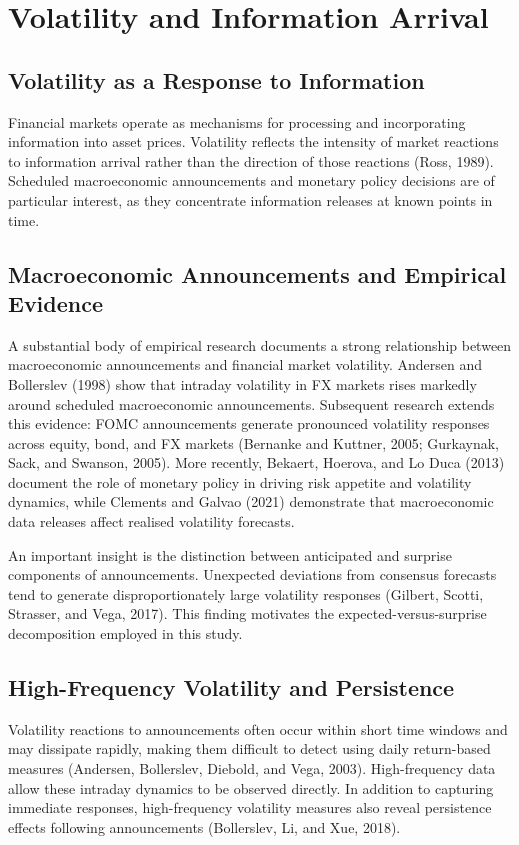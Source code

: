 \documentclass[12pt,a4paper]{report}
\begin{document}
\section{Volatility and Information Arrival}
\subsection{Volatility as a Response to Information}
Financial markets operate as mechanisms for processing and incorporating information into asset prices. Volatility reflects the intensity of market reactions to information arrival rather than the direction of those reactions (Ross, 1989). Scheduled macroeconomic announcements and monetary policy decisions are of particular interest, as they concentrate information releases at known points in time.

\subsection{Macroeconomic Announcements and Empirical Evidence}
A substantial body of empirical research documents a strong relationship between macroeconomic announcements and financial market volatility. Andersen and Bollerslev (1998) show that intraday volatility in FX markets rises markedly around scheduled macroeconomic announcements. Subsequent research extends this evidence: FOMC announcements generate pronounced volatility responses across equity, bond, and FX markets (Bernanke and Kuttner, 2005; Gurkaynak, Sack, and Swanson, 2005). More recently, Bekaert, Hoerova, and Lo Duca (2013) document the role of monetary policy in driving risk appetite and volatility dynamics, while Clements and Galvao (2021) demonstrate that macroeconomic data releases affect realised volatility forecasts.

An important insight is the distinction between anticipated and surprise components of announcements. Unexpected deviations from consensus forecasts tend to generate disproportionately large volatility responses (Gilbert, Scotti, Strasser, and Vega, 2017). This finding motivates the expected-versus-surprise decomposition employed in this study.

\subsection{High-Frequency Volatility and Persistence}
Volatility reactions to announcements often occur within short time windows and may dissipate rapidly, making them difficult to detect using daily return-based measures (Andersen, Bollerslev, Diebold, and Vega, 2003). High-frequency data allow these intraday dynamics to be observed directly. In addition to capturing immediate responses, high-frequency volatility measures also reveal persistence effects following announcements (Bollerslev, Li, and Xue, 2018).
\end{document}
